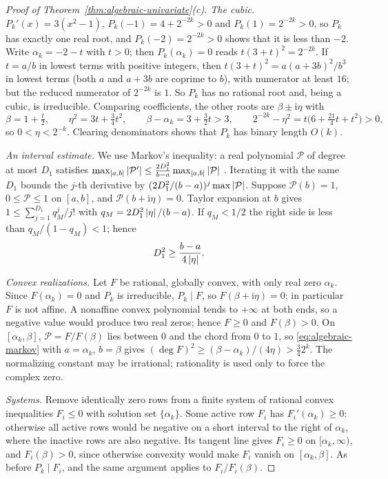 \begin{proof}[Proof of Theorem~\ref{thm:algebraic-univariate}(c)]
\emph{The cubic.} $P_k'(x)=3(x^2-1)$, $P_k(-1)=4+2^{-2k}>0$ and
$P_k(1)=2^{-2k}>0$, so $P_k$ has exactly one real root, and $P_k(-2)=2^{-2k}>0$
shows that it is less than $-2$. Write $\alpha_k=-2-t$ with $t>0$; then
$P_k(\alpha_k)=0$ reads $t(3+t)^2=2^{-2k}$. If $t=a/b$ in lowest terms with
positive integers, then $t(3+t)^2=a(a+3b)^2/b^3$ in lowest terms (both $a$ and
$a+3b$ are coprime to $b$), with numerator at least $16$; but the reduced
numerator of $2^{-2k}$ is $1$. So $P_k$ has no rational root and, being a
cubic, is irreducible. Comparing coefficients, the other roots are
$\beta\pm\mathrm i\eta$ with
\[
 \beta=1+\tfrac t2,\qquad \eta^2=3t+\tfrac34t^2,\qquad
 \beta-\alpha_k=3+\tfrac32t>3,\qquad 2^{-2k}-\eta^2=t\bigl(6+\tfrac{21}4t+t^2\bigr)>0,
\]
so $0<\eta<2^{-k}$. Clearing denominators shows that $P_k$ has binary length
$O(k)$.

\emph{An interval estimate.} We use Markov's inequality: a real polynomial
$\mathcal P$ of degree at most $D_1$ satisfies
$\max_{[a,b]}\left\lvert\mathcal P'\right\rvert\le\frac{2D_1^2}{b-a}\max_{[a,b]}\left\lvert\mathcal P\right\rvert$
\cite[Theorem~5.1.8]{BorweinErdelyi1995}. Iterating it with the same $D_1$
bounds the $j$-th derivative by $(2D_1^2/(b-a))^j\max\left\lvert\mathcal P\right\rvert$. Suppose
$\mathcal P(b)=1$, $0\le\mathcal P\le1$ on $[a,b]$, and
$\mathcal P(b+\mathrm i\eta)=0$. Taylor expansion at $b$ gives
$1\le\sum_{j=1}^{D_1}q_M^j/j!$ with $q_M=2D_1^2\left\lvert\eta\right\rvert/(b-a)$. If $q_M<1/2$ the
right side is less than $q_M/(1-q_M)<1$; hence
\begin{equation}
 D_1^2\ge\frac{b-a}{4\left\lvert\eta\right\rvert}.
 \label{eq:algebraic-markov}
\end{equation}

\emph{Convex realizations.} Let $F$ be rational, globally convex, with only
real zero $\alpha_k$. Since $F(\alpha_k)=0$ and $P_k$ is irreducible,
$P_k\mid F$, so $F(\beta+\mathrm i\eta)=0$; in particular $F$ is not affine.
A nonaffine convex polynomial tends to $+\infty$ at both ends, so a negative
value would produce two real zeros; hence $F\ge0$ and $F(\beta)>0$. On
$[\alpha_k,\beta]$, $\mathcal P=F/F(\beta)$ lies between $0$ and the chord
from $0$ to $1$, so \eqref{eq:algebraic-markov} with $a=\alpha_k$, $b=\beta$
gives $(\deg F)^2\ge(\beta-\alpha_k)/(4\eta)>\tfrac342^k$. The normalizing
constant may be irrational; rationality is used only to force the complex
zero.

\emph{Systems.} Remove identically zero rows from a finite system of rational
convex inequalities $F_i\le0$ with solution set $\{\alpha_k\}$. Some active
row $F_i$ has $F_i'(\alpha_k)\ge0$: otherwise all active rows would be
negative on a short interval to the right of $\alpha_k$, where the inactive
rows are also negative. Its tangent line gives $F_i\ge0$ on
$[\alpha_k,\infty)$, and $F_i(\beta)>0$, since otherwise convexity would make
$F_i$ vanish on $[\alpha_k,\beta]$. As before $P_k\mid F_i$, and the same
argument applies to $F_i/F_i(\beta)$.


\end{proof}
